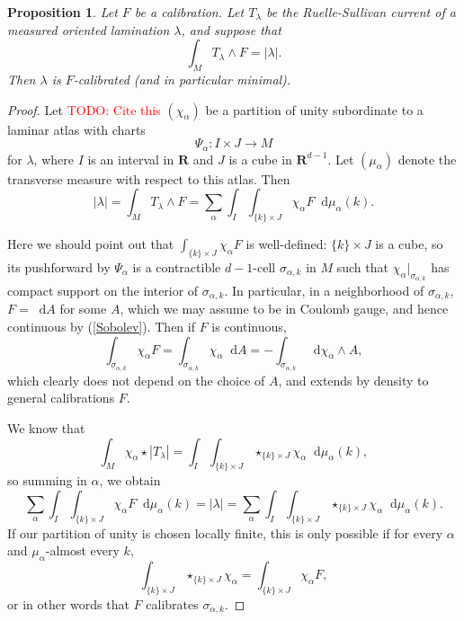 \documentclass[reqno,11pt]{amsart}
\newcommand{\RR}{\mathbf{R}}
\newcommand*\dif{\mathop{}\!\mathrm{d}}
\newtheorem{proposition}[theorem]{Proposition}
\theoremstyle{definition}
\numberwithin{equation}{section}
\newcommand\todo[1]{\textcolor{red}{TODO: #1}}
\begin{document}
\begin{proposition}\label{calibration condition}
Let $F$ be a calibration.
Let $T_\lambda$ be the Ruelle-Sullivan current of a measured oriented lamination $\lambda$, and suppose that 
\begin{equation}\label{calibration by Ruelle Sullivan}
\int_M T_\lambda \wedge F = |\lambda|.
\end{equation}
Then $\lambda$ is $F$-calibrated (and in particular minimal).
\end{proposition}
\begin{proof}
Let \todo{Cite this} $(\chi_\alpha)$ be a partition of unity subordinate to a laminar atlas with charts
$$\Psi_\alpha: I \times J \to M$$
for $\lambda$, where $I$ is an interval in $\RR$ and $J$ is a cube in $\RR^{d - 1}$.
Let $(\mu_\alpha)$ denote the transverse measure with respect to this atlas.
Then 
$$|\lambda| = \int_M T_\lambda \wedge F = \sum_\alpha \int_I \int_{\{k\} \times J} \chi_\alpha F \dif \mu_\alpha(k).$$

Here we should point out that $\int_{\{k\} \times J} \chi_\alpha F$ is well-defined: $\{k\} \times J$ is a cube, so its pushforward by $\Psi_\alpha$ is a contractible $d-1$-cell $\sigma_{\alpha, k}$ in $M$ such that $\chi_\alpha|_{\sigma_{\alpha, k}}$ has compact support on the interior of $\sigma_{\alpha, k}$.
In particular, in a neighborhood of $\sigma_{\alpha, k}$, $F = \dif A$ for some $A$, which we may assume to be in Coulomb gauge, and hence continuous by (\ref{Sobolev}).
Then if $F$ is continuous,
$$\int_{\sigma_{\alpha, k}} \chi_\alpha F = \int_{\sigma_{\alpha, k}} \chi_\alpha \dif A = -\int_{\sigma_{\alpha, k}} \dif \chi_\alpha \wedge A,$$
which clearly does not depend on the choice of $A$, and extends by density to general calibrations $F$.

We know that 
$$\int_M \chi_\alpha \star |T_\lambda| = \int_I \int_{\{k\} \times J} \star_{\{k\} \times J} \chi_\alpha \dif \mu_\alpha(k),$$
so summing in $\alpha$, we obtain 
$$\sum_\alpha \int_I \int_{\{k\} \times J} \chi_\alpha F \dif \mu_\alpha(k) = |\lambda| = \sum_\alpha \int_I \int_{\{k\} \times J} \star_{\{k\} \times J} \chi_\alpha \dif \mu_\alpha(k).$$
If our partition of unity is chosen locally finite, this is only possible if for every $\alpha$ and $\mu_\alpha$-almost every $k$, 
$$\int_{\{k\} \times J} \star_{\{k\} \times J} \chi_\alpha = \int_{\{k\} \times J} \chi_\alpha F,$$
or in other words that $F$ calibrates $\sigma_{\alpha, k}$.


\end{proof}
\end{document}
